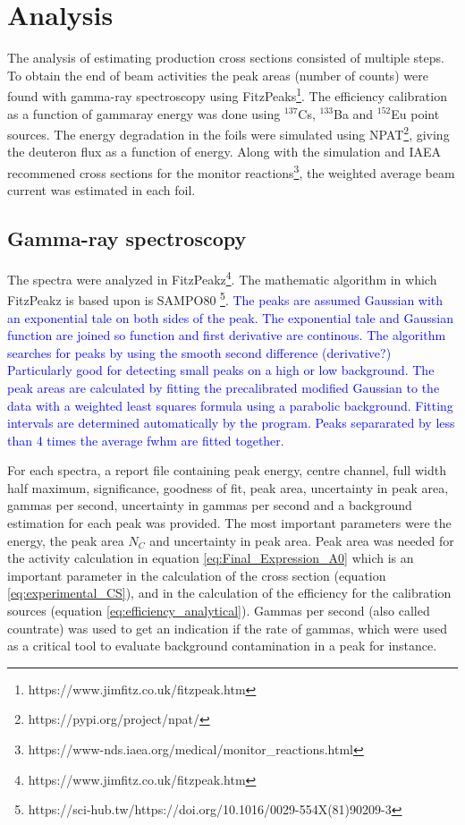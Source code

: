 \chapter{Analysis}




The analysis of estimating production cross sections consisted of multiple steps. To obtain the end of beam activities the peak areas (number of counts) were found with gamma-ray spectroscopy using FitzPeaks\footnote{https://www.jimfitz.co.uk/fitzpeak.htm}. The efficiency calibration as a function of gammaray energy was done using $^{137}$Cs, $^{133}$Ba and $^{152}$Eu point sources. The energy degradation in the foils were simulated using NPAT\footnote{https://pypi.org/project/npat/}, giving the deuteron flux as a function of energy. Along with the simulation and IAEA recommened cross sections for the monitor reactions\footnote{https://www-nds.iaea.org/medical/monitor_reactions.html}, the weighted average beam current was estimated in each foil. 

\section{Gamma-ray spectroscopy}
The spectra were analyzed in FitzPeakz\footnote{https://www.jimfitz.co.uk/fitzpeak.htm}. The mathematic algorithm in which FitzPeakz is based upon is SAMPO80 \footnote{https://sci-hub.tw/https://doi.org/10.1016/0029-554X(81)90209-3}. \textcolor{blue}{The peaks are assumed Gaussian with an exponential tale on both sides of the peak. The exponential tale and Gaussian function are joined so function and first derivative are continous. The algorithm searches for peaks by using the smooth second difference (derivative?) Particularly good for detecting small peaks on a high or low background. The peak areas are calculated by fitting the precalibrated modified Gaussian to the data with a weighted least squares formula using a parabolic background. Fitting intervals are determined automatically by the program. Peaks separarated by less than 4 times the average fwhm are fitted together. }

For each spectra,  a report file containing peak energy, centre channel, full width half maximum, significance, goodness of fit, peak area, uncertainty in peak area, gammas per second, uncertainty in gammas per second and a background estimation for each peak was provided. The most important parameters were the energy, the peak area $N_C$ and uncertainty in peak area. Peak area was needed for the activity calculation in equation \ref{eq:Final_Expression_A0} which is an important parameter in the calculation of the cross section (equation \ref{eq:experimental_CS}), and in the calculation of the efficiency for the calibration sources (equation \ref{eq:efficiency_analytical}). Gammas per second (also called countrate) was used to get an indication if the rate of gammas, which were used as a critical tool to evaluate background contamination in a peak for instance. 

